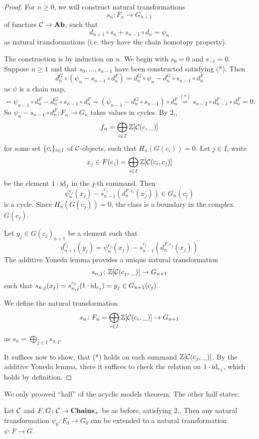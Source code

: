 \documentclass[language=english]{TemplateLecture}
\begin{document}

\begin{proof}
    For \(n \geq 0\), we will construct natural transformations
    \[s_n\colon F_n \to G_{n+1}\]
    of functors \(\mathcal{C} \to \mathbf{Ab}\), such that
    \begin{equation}\tag{*}
        d_{n+1} \circ s_n + s_{n-1} \circ d_n = \psi_n
    \end{equation}
    as natural transformations (i.e. they have the chain homotopy property).

    The construction is by induction on \(n.\) We begin with \(s_0 = 0\) and \(s_{-1} = 0\). Suppose \(n \geq 1\) and that \(s_0, \dots, s_{n-1}\) have been constructed satisfying (*). Then
    \[d_n^G \circ (\psi_n - s_{n-1} \circ d_n^F) = d_n^G \circ \psi_n - d_n^G \circ s_{n-1} \circ d_n^F\]
    as \(\psi\) is a chain map,
    \[= \psi_{n-1} \circ d_n^F - d_n^G \circ s_{n-1} \circ d_n^F = (\psi_{n-1} - d_n^G \circ s_{n-1}) \circ d_n^F \overset{(*)}{=} s_{n-2} \circ d_{n-1}^F \circ d_n^F = 0.\]
    So \(\psi_n - s_{n-1} \circ d_n^F\colon F_n \to G_n\) takes values in cycles.
    By 2.,
    \[f_n = \bigoplus_{i \in I} \mathbb{Z}[\mathcal{C}(c, \_)]\]
    for some set \(\{c_i\}_{i \in I}\) of \(\mathcal{C}\)-objects, such that \(H_n(G(c_i)) = 0\). Let \(j \in I\), write
    \[x_j \in F(c_j) = \bigoplus_{i \in I} \mathbb{Z}[\mathcal{C}(c_i,c_j)]\]
    be the element \(1 \cdot \operatorname{id}_j\) in the \(j\)-th summand. Then
    \[\psi_n^{c_j}(x_j) - s_{n-1}^{{c_j}}(d_n^{F, c_i}(x_j)) \in G_n(c_j)\]
    is a cycle. Since \(H_n(G(c_j)) = 0\), the class is a boundary in the complex \(G(c_j)\).

    Let \(y_j \in G(c_j)_{n+1}\) be a element such that
    \[d_{n+1}^{c_j}(y_j) = \psi_n^{c_j}(x_j) - s_{n-1}^{c_j}(d_n^{F, c_j}(x_j))\]
    The additive Yoneda lemma provides a unique natural transformation
    \[s_{n,j} \colon \mathbb{Z}[\mathcal{C}(c_j, \_)] \to G_{n+1}\]
    such that \(s_{n,j}(x_j) = s_{n,j}^{c_j}(1\cdot \operatorname{id}_{c_j}) = y_j \in G_{n+1}(c_j)\).

    We define the natural transformation
    \[s_n\colon F_n = \bigoplus_{i \in I} \mathbb{Z}[\mathcal{C}(c_i, \_)] \to G_{n+1}\]
    as \(s_n = \bigoplus_{j \in I} s_{n,j}\).

    It suffices now to show, that (*) holds on each summand \(\mathbb{Z}[\mathcal{C}(c_j, \_)]\). By the additive Yoneda lemma, there it suffices to check the relation on \(1\cdot \operatorname{id}_{c_j}\), which holds by definition.
\end{proof}

\begin{Remark}
    We only prooved \enquote{half} of the acyclic models theorem. The other half states:

    Let \(\mathcal{C}\) and \(F,G\colon \mathcal{C} \to \mathbf{Chains}_+\) be as before, satisfying 2.. Then any natural transformation \(\psi_0\colon F_0 \to G_0\) can be extended to a natural transformation \(\psi\colon F \to G\).
\end{Remark}
\end{document}
